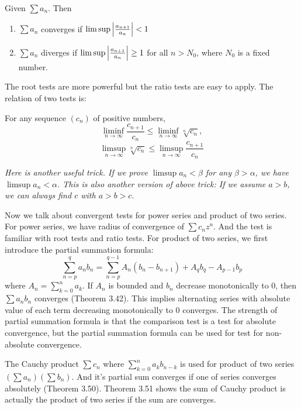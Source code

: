 \begin{theorem}
    Given $\sum a_n$. Then 
    \begin{enumerate}
        \item $\sum a_n$ converges if $\limsup\left\lvert\frac{a_{n+1}}{a_n}\right\rvert<1$ 
        \item $\sum a_n$ diverges if $\limsup\left\lvert\frac{a_{n+1}}{a_n}\right\rvert\geq 1$ for all $n>N_0$, where $N_0$ is a fixed number.
    \end{enumerate}
\end{theorem}
The root tests are more powerful but the ratio tests are easy to apply. The relation of two tests is:
\begin{theorem}
    For any sequence $(c_n)$ of positive numbers,
    \begin{equation*}
        \liminf_{n\to \infty}\frac{c_{n+1}}{c_n}\leq \liminf_{n\to \infty}\sqrt[n]{c_n},
    \end{equation*}
    \begin{equation*}
         \limsup_{n\to \infty}\sqrt[n]{c_n}\leq\limsup_{n\to \infty}\frac{c_{n+1}}{c_n}
    \end{equation*}
\end{theorem}
\emph{Here is another useful trick. If we prove $\limsup a_n<\beta$ for any $\beta>\alpha$, we have  $\limsup a_n<\alpha$. This is also another version of above trick: If we assume $a>b$, we can always find $c$ with $a>b>c$}.\par
Now we talk about convergent tests for power series and product of two series. For power series, we have radius of convergence of $\sum c_nz^n$. And the test is familiar with root tests and ratio tests. For product of two series, we first introduce the partial summation formula:
\begin{equation}
    \sum_{n=p}^q a_n b_n=\sum_{n=p}^{q-1}A_n(b_n-b_{n+1})+A_q b_q-A_{p-1}b_p
\end{equation}
where $A_n=\sum_{k=0}^na_k$.
If $A_n$ is bounded and $b_n$ decrease monotonically to 0, then $\sum a_n b_n$ converges (Theorem 3.42). This implies alternating series with absolute value of each term decreasing monotonically to 0 converges. The strength of partial summation formula is that the comparison test is a test for absolute convergence, but the partial summation formula can be used for test for non-absolute convergence.\par
The Cauchy product $\sum c_n$ where $\sum_{k=0}^na_kb_{n-k}$ is used for product of two series $(\sum a_n)(\sum b_n)$. And it's partial sum converges if one of series converges absolutely (Theorem 3.50). Theorem 3.51 shows the sum of Cauchy product is actually the product of two series if the sum are converges.\par
